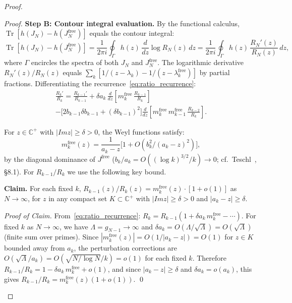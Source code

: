 \documentclass{pre-aomart}
\def\Im{Im}%
\theoremstyle{plain}
\theoremstyle{definition}
\theoremstyle{remark}
\begin{document}
\begin{proof}
\begin{proof}
\textbf{Step B: Contour integral evaluation.}
By the functional calculus,
$\operatorname{Tr}[h(J_N) - h(J_N^{\mathrm{free}})]$ equals the contour integral:
\begin{equation}\label{eq:contour_trace}
\operatorname{Tr}[h(J_N) - h(J_N^{\mathrm{free}})]
= \frac{1}{2\pi i}\oint_\Gamma h(z)\,\frac{d}{dz}\log R_N(z)\,dz
= \frac{1}{2\pi i}\oint_\Gamma h(z)\,\frac{R_N'(z)}{R_N(z)}\,dz,
\end{equation}
where $\Gamma$ encircles the spectra of both $J_N$ and $J_N^{\mathrm{free}}$.
The logarithmic derivative $R_N'(z)/R_N(z)$ equals
$\sum_k [1/(z - \lambda_k) - 1/(z - \lambda_k^{\mathrm{free}})]$
by partial fractions.
Differentiating the recurrence~\eqref{eq:ratio_recurrence}:
\begin{multline}\label{eq:log_deriv_recurrence}
\frac{R_k'}{R_k} = \frac{R_{k-1}'}{R_{k-1}}
  + \delta a_k\,\frac{d}{dz}\!\left[m_k^{\mathrm{free}}\,\frac{R_{k-1}}{R_k}\right]\\
  - \bigl[2b_{k-1}\delta b_{k-1} + (\delta b_{k-1})^2\bigr]
    \frac{d}{dz}\!\left[m_k^{\mathrm{free}}\,m_{k-1}^{\mathrm{free}}\,\frac{R_{k-2}}{R_k}\right].
\end{multline}

For $z \in \mathbb{C}^+$ with $|\Im z| \ge \delta > 0$, the Weyl functions satisfy:
\begin{equation}\label{eq:m_free_bounds}
m_k^{\mathrm{free}}(z) = \frac{1}{a_k - z}\bigl[1 + O(b_k^2/(a_k - z)^2)\bigr],
\end{equation}
by the diagonal dominance of $J^{\mathrm{free}}$
($b_k/a_k = O((\log k)^{3/2}/k) \to 0$; cf.\ Teschl~\cite{Teschl2000}, \S8.1).
For $R_{k-1}/R_k$ we use the following key bound.

\noindent\textbf{Claim.}
For each fixed $k$, $R_{k-1}(z)/R_k(z) = m_k^{\mathrm{free}}(z)\cdot[1 + o(1)]$
as $N \to \infty$, for $z$ in any compact set $K \subset \mathbb{C}^+$
with $|\Im z| \ge \delta > 0$ and $|a_k - z| \ge \delta$.
\smallskip

\noindent\textit{Proof of Claim.}
From~\eqref{eq:ratio_recurrence}:
$R_k = R_{k-1}(1 + \delta a_k\,m_k^{\mathrm{free}} - \cdots)$.
For fixed $k$ as $N \to \infty$, we have $\Lambda = g_{N-1} \to \infty$ and
$\delta a_k = O(\Lambda/\sqrt{\Lambda}) = O(\sqrt{\Lambda})$ (finite sum over
primes).  Since $|m_k^{\mathrm{free}}(z)| = O(1/|a_k - z|) = O(1)$ for
$z \in K$ bounded away from $a_k$, the perturbation corrections are
$O(\sqrt{\Lambda}/a_k) = O(\sqrt{N/\log N}/k) = o(1)$ for each fixed $k$.
Therefore $R_{k-1}/R_k = 1 - \delta a_k\,m_k^{\mathrm{free}} + o(1)$,
and since $|a_k - z| \ge \delta$ and $\delta a_k = o(a_k)$,
this gives $R_{k-1}/R_k = m_k^{\mathrm{free}}(z)(1 + o(1))$.
\qed


\end{proof}
\end{proof}
\end{document}
